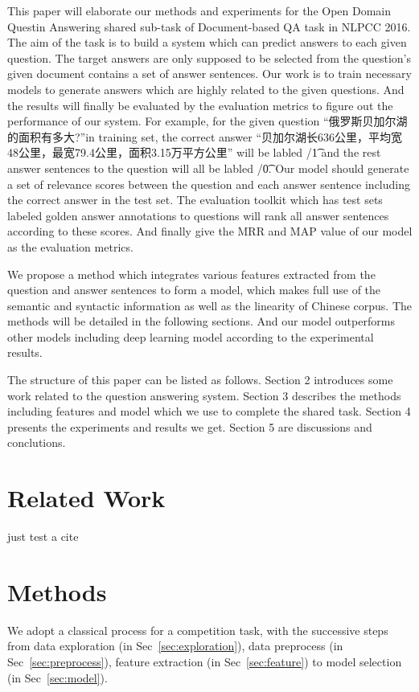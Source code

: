 \documentclass{llncs}
\begin{document}
This paper will elaborate our methods and experiments for the Open Domain Questin Answering shared sub-task of Document-based QA task in NLPCC 2016. The aim of the task is to build a system which can predict answers to each given question. The target answers are only supposed to be selected from the question's given document contains a set of answer sentences. Our work is to train necessary models to generate answers which are highly related to the given questions. And the results will finally be evaluated by the evaluation metrics to figure out the performance of our system. For example, for the given question “俄罗斯贝加尔湖的面积有多大?”in training set, the correct answer “贝加尔湖长636公里，平均宽48公里，最宽79.4公里，面积3.15万平方公里” will be labled /\t1 and the rest answer sentences to the question will all be labled /\t0. Our model should generate a set of relevance scores between the question and each answer sentence including the correct answer in the test set. The evaluation toolkit which has test sets labeled golden answer annotations to questions will rank all answer sentences according to these scores. And finally give the MRR and MAP value of our model as the evaluation metrics.

We propose a method which integrates various features extracted from the question and answer sentences to form a model, which makes full use of the semantic and syntactic information as well as the linearity of Chinese corpus. The methods will be detailed in the following sections. And our model outperforms other models including deep learning model according to the  experimental results.  

The structure of this paper can be listed as follows. Section 2 introduces some work related to the question answering system. Section 3 describes the methods including features and model which we use to complete the shared task. Section 4  presents the experiments and results we get. Section 5 are discussions and conclutions.

\section{Related Work}
just test a cite~\cite{Severyn2015Learning}

\section{Methods}

We adopt a classical process for a competition task, with the successive steps from data exploration (in Sec~\ref{sec:exploration}), data preprocess (in Sec~\ref{sec:preprocess}), feature extraction (in Sec~\ref{sec:feature}) to model selection (in Sec~\ref{sec:model}).
\end{document}
